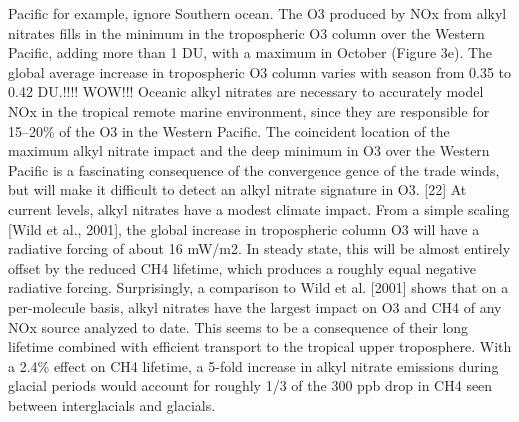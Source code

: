 \documentclass[11pt,a4paper]{article}
\begin{document}
Pacific for example, ignore Southern ocean.
The O3 produced by NOx from alkyl nitrates fills in
the minimum in the tropospheric O3 column over the Western Pacific, adding more than 1 DU, with a maximum in October (Figure 3e). The global average increase in tropospheric O3 column varies with season from 0.35 to 0.42 DU.!!!!
WOW!!!
Oceanic alkyl nitrates are necessary to accurately
model NOx in the tropical remote marine environment, since they are responsible for 15–20\% of the O3 in the Western Pacific. The coincident location of the maximum alkyl nitrate impact and the deep minimum in O3 over the Western Pacific is a fascinating consequence of the convergence gence of the trade winds, but will make it difficult to detect an alkyl nitrate signature in O3. [22] At current levels, alkyl nitrates have a modest climate impact. From a simple scaling [Wild et al., 2001], the global increase in tropospheric column O3 will have a radiative forcing of about 16 mW/m2. In steady state, this will be almost entirely offset by the reduced CH4 lifetime, which produces a roughly equal negative radiative forcing. Surprisingly, a comparison to Wild et al. [2001] shows that on a per-molecule basis, alkyl nitrates have the largest impact on O3 and CH4 of any NOx source analyzed to date. This seems to be a consequence of their long lifetime combined with efficient transport to the tropical upper troposphere. With a 2.4\% effect on CH4 lifetime, a 5-fold increase in alkyl nitrate emissions during glacial periods would account for roughly 1/3 of the 300 ppb drop in CH4 seen between interglacials and glacials.
\end{document}
